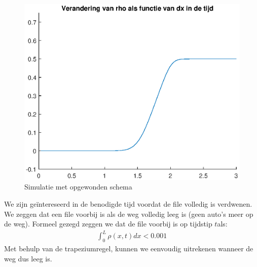 \documentclass{article}
\begin{document}
\begin{figure}[H]
\centering
\includegraphics[scale=0.8]{6goed.eps}
\caption{Simulatie met opgewonden schema}
\end{figure}
We zijn ge\"intereseerd in de benodigde tijd voordat de file volledig is verdwenen.
We zeggen dat een file voorbij is als de weg volledig leeg is (geen auto's meer op de weg). 
Formeel gezegd zeggen we dat de file voorbij is  op tijdstip \(t\)als:
\begin{align*}
	\int_{0}^L\rho(x,t)dx<0.001
\end{align*}
Met behulp van de trapeziumregel, kunnen we eenvoudig uitrekenen wanneer de weg dus leeg is.
\end{document}

